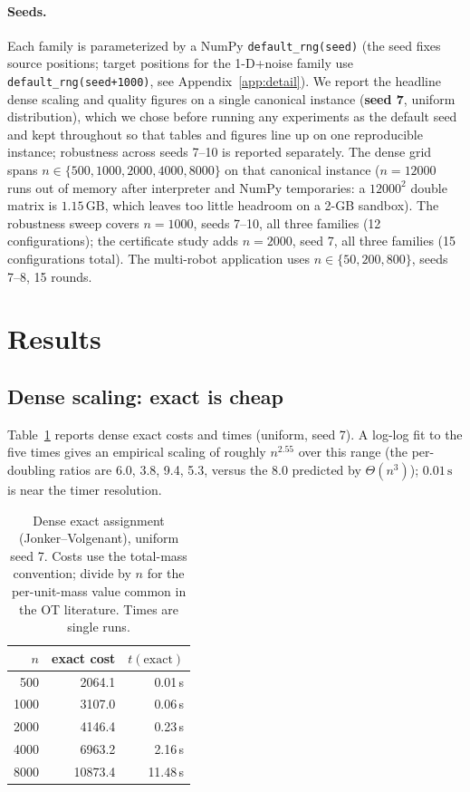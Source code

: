 \documentclass[11pt]{article}
\theoremstyle{remark}
\begin{document}
\paragraph{Seeds.} Each family is parameterized by a NumPy
\texttt{default\_rng(seed)} (the seed fixes source positions; target
positions for the 1-D+noise family use \texttt{default\_rng(seed+1000)},
see Appendix~\ref{app:detail}). We report the headline dense scaling and
quality figures on a single canonical instance (\textbf{seed 7}, uniform
distribution), which we chose before running any experiments as the
default seed and kept throughout so that tables and figures line up on
one reproducible instance; robustness across seeds 7--10 is reported
separately. The dense grid spans $n\in\{500,1000,2000,4000,8000\}$ on
that canonical instance ($n=12000$ runs out of memory after interpreter
and NumPy temporaries: a $12000^2$ double matrix is $1.15\,\mathrm{GB}$,
which leaves too little headroom on a 2-GB sandbox). The robustness
sweep covers $n=1000$, seeds 7--10, all three families (12
configurations); the certificate study adds $n=2000$, seed 7, all three
families (15 configurations total). The multi-robot application uses
$n\in\{50,200,800\}$, seeds 7--8, 15 rounds.

\section{Results}
\label{sec:results}

\subsection{Dense scaling: exact is cheap}
Table~\ref{tab:dense} reports dense exact costs and times (uniform, seed 7).
A log-log fit to the five times gives an empirical scaling of roughly
$n^{2.55}$ over this range (the per-doubling ratios are 6.0, 3.8, 9.4,
5.3, versus the 8.0 predicted by $\Theta(n^3)$); $0.01\,\mathrm{s}$ is
near the timer resolution.

\begin{table}[t]
\centering
\begin{tabular}{rrr}
\toprule
$n$ & exact cost & $t(\mathrm{exact})$ \\
\midrule
500  & 2064.1  & 0.01\,s \\
1000 & 3107.0  & 0.06\,s \\
2000 & 4146.4  & 0.23\,s \\
4000 & 6963.2  & 2.16\,s \\
8000 & 10873.4 & 11.48\,s \\
\bottomrule
\end{tabular}
\caption{Dense exact assignment (Jonker--Volgenant), uniform seed 7.
  Costs use the total-mass convention; divide by $n$ for the per-unit-mass
  value common in the OT literature. Times are single runs.}
\label{tab:dense}
\end{table}
\end{document}
